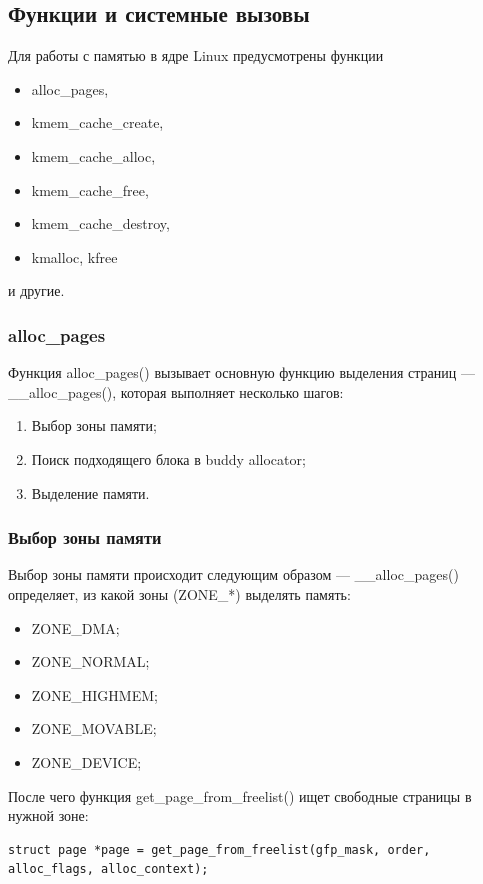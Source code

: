 \subsection{Функции и системные вызовы}

Для работы с памятью в ядре Linux предусмотрены функции
\begin{itemize}
    \item alloc\_pages,
    \item kmem\_cache\_create,
    \item kmem\_cache\_alloc,
    \item kmem\_cache\_free,
    \item kmem\_cache\_destroy,
    \item kmalloc, kfree
\end{itemize}
и другие.

\subsubsection{alloc\_pages}

Функция alloc\_pages() вызывает основную функцию выделения страниц --- \_\_alloc\_pages(), которая выполняет несколько шагов:
\begin{enumerate}
    \item Выбор зоны памяти;
    \item Поиск подходящего блока в buddy allocator;
    \item Выделение памяти.
\end{enumerate}

\subsubsection*{Выбор зоны памяти}

Выбор зоны памяти происходит следующим образом --- \_\_alloc\_pages() определяет, из какой зоны (ZONE\_*) выделять память:
\begin{itemize}
    \item ZONE\_DMA;
    \item ZONE\_NORMAL;
    \item ZONE\_HIGHMEM;
    \item ZONE\_MOVABLE;
    \item ZONE\_DEVICE;
\end{itemize}

После чего функция get\_page\_from\_freelist() ищет свободные страницы в нужной зоне:
\begin{lstlisting}
struct page *page = get_page_from_freelist(gfp_mask, order, alloc_flags, alloc_context);
\end{lstlisting}

